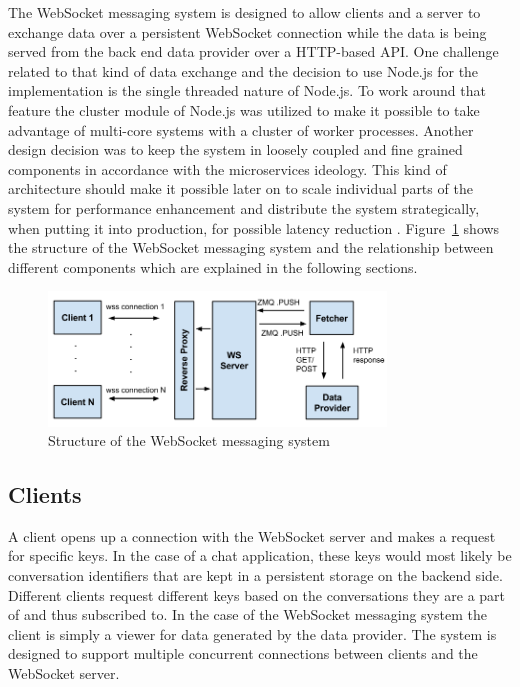 The WebSocket messaging system is designed to allow clients and a server to exchange data over a persistent WebSocket connection while the data is being served from the back end data provider over a HTTP-based API. One challenge related to that kind of data exchange and the decision to use Node.js for the implementation is the single threaded nature of Node.js. To work around that feature the cluster module of Node.js was utilized to make it possible to take advantage of multi-core systems with a cluster of worker processes. Another design decision was to keep the system in loosely coupled and fine grained components in accordance with the microservices ideology. This kind of architecture should make it possible later on to scale individual parts of the system for performance enhancement and distribute the system strategically, when putting it into production, for possible latency reduction \cite{tilkovMicroservices}. Figure~\ref{fig:webSocketMessagingSystem} shows the structure of the WebSocket messaging system and the relationship between different components which are explained in the following sections.
\\
\begin{figure}[h!]
	\centering
	\includegraphics[width=0.8\textwidth]{images/websocketMessagingSystem}
	\caption{Structure of the WebSocket messaging system}
	\label{fig:webSocketMessagingSystem}
\end{figure}

\subsection{Clients}

A client opens up a connection with the WebSocket server and makes a request for specific keys. In the case of a chat application, these keys would most likely be conversation identifiers that are kept in a persistent storage on the backend side. Different clients request different keys based on the conversations they are a part of and thus subscribed to. In the case of the WebSocket messaging system the client is simply a viewer for data generated by the data provider. The system is designed to support multiple concurrent connections between clients and the WebSocket server.

